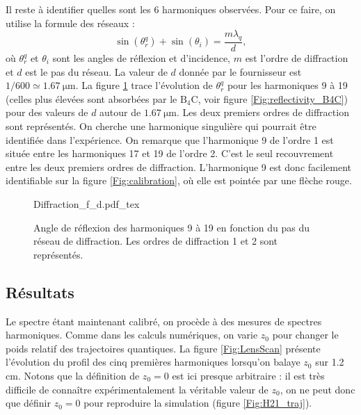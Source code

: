Il reste à identifier quelles sont les 6 harmoniques observées. Pour ce faire, on utilise la formule des réseaux :
\[\sin(\theta_r^q)+\sin(\theta_i) = \frac{m\lambda_q}{d},\]
où $\theta_r^q$ et $\theta_i$ sont les angles de réflexion et d'incidence, $m$ est l'ordre de diffraction et $d$ est le pas du réseau. La valeur de $d$ donnée par le fournisseur est $1/600\simeq \SI{1.67}{\micro \metre}$. La figure \ref{fig:formulereseau} trace l'évolution de $\theta_r^q$ pour les harmoniques 9 à 19 (celles plus élevées sont absorbées par le $\mathrm{B}_\mathrm{4}\mathrm{C}$, voir figure \ref{Fig:reflectivity_B4C}) pour des valeurs de $d$ autour de $\SI{1.67}{\micro\metre}$. Les deux premiers ordres de diffraction sont représentés. On cherche une harmonique singulière qui pourrait être identifiée dans l'expérience. On remarque que l'harmonique 9 de l'ordre 1 est située entre les harmoniques 17 et 19 de l'ordre 2. C'est le seul recouvrement entre les deux premiers ordres de diffraction. L'harmonique 9 est donc facilement identifiable sur la figure \ref{Fig:calibration}, où elle est pointée par une flèche rouge.

\begin{figure}[!ht]
\centering
\def\svgwidth{1\columnwidth}
{Diffraction_f_d.pdf_tex}
\caption{Angle de réflexion des harmoniques 9 à 19 en fonction du pas du réseau de diffraction. Les ordres de diffraction 1 et 2 sont représentés.}
\label{fig:formulereseau}
\end{figure}

\subsection{Résultats}
Le spectre étant maintenant calibré, on procède à des mesures de spectres harmoniques. Comme dans les calculs numériques, on varie $z_0$ pour changer le poids relatif des trajectoires quantiques. La figure \ref{Fig:LensScan} présente l'évolution du profil des cinq premières harmoniques lorsqu'on balaye $z_0$ sur 1.2 cm. Notons que la définition de $z_0=0$ est ici presque arbitraire : il est très difficile de connaître expérimentalement la véritable valeur de $z_0$, on ne peut donc que définir $z_0=0$ pour reproduire la simulation (figure \ref{Fig:H21_traj}).


